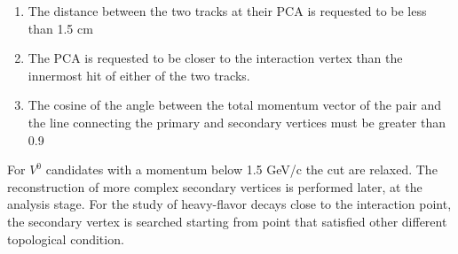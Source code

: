 \documentclass[12pt,a4paper]{book}
\begin{document}
	 \begin{enumerate}
	 	\item The distance between the two tracks at their PCA is requested to be less than 1.5 cm
	 	\item The PCA is requested to be closer to the interaction vertex than the innermost hit of either of the two tracks.
	 	\item The cosine of the angle between the total momentum vector of the
	 	pair and the line connecting the primary and secondary vertices must be greater than 0.9
	 \end{enumerate} 
	 For $V^0$ candidates with a momentum below 1.5 GeV/c the cut are relaxed. The reconstruction of more complex secondary vertices is performed later, at the analysis stage. For the study of heavy-flavor decays close to the interaction point, the secondary vertex is searched starting from point that satisfied other different topological condition. \cite{ALICE:2014sbx}
	 
\end{document}
